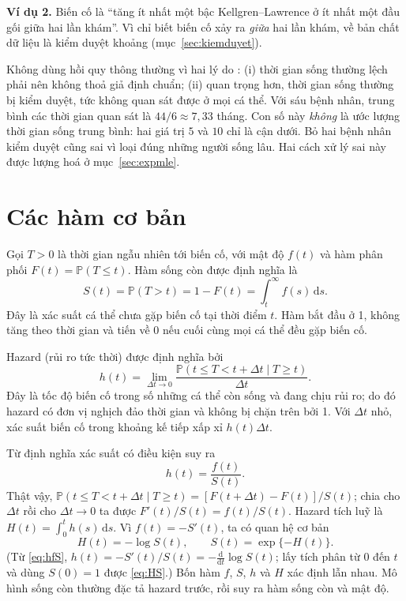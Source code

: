 \documentclass[11pt,a4paper,notitlepage]{report}
\newcommand{\Prob}{\mathbb{P}}
\newcommand{\dd}{\,\mathrm{d}}
\newcommand{\bs}[1]{\textcolor{bsblue}{#1}}
\begin{document}
\textbf{Ví dụ 2.} Biến cố là ``tăng ít nhất một bậc Kellgren--Lawrence ở ít nhất một đầu gối giữa hai lần khám''.
Vì chỉ biết biến cố xảy ra \emph{giữa} hai lần khám, về bản chất dữ liệu là kiểm duyệt khoảng (mục~\ref{sec:kiemduyet}). \cite{arbeeva2020}

Không dùng hồi quy thông thường vì hai lý do \cite{arbeeva2020}: (i) thời gian sống thường lệch phải nên không thoả giả định chuẩn; (ii) quan trọng hơn,
thời gian sống thường bị kiểm duyệt, tức không quan sát được ở mọi cá thể.
Với sáu bệnh nhân, trung bình các thời gian quan sát là $44/6\approx 7{,}33$ tháng. Con số này \emph{không} là ước lượng thời gian sống trung bình:
hai giá trị $5$ và $10$ chỉ là cận dưới. Bỏ hai bệnh nhân kiểm duyệt cũng sai vì loại đúng những người sống lâu. Hai cách xử lý sai này được lượng hoá ở mục~\ref{sec:expmle}.

\section{Các hàm cơ bản}

Gọi $T>0$ là thời gian ngẫu nhiên tới biến cố, với mật độ $f(t)$ và hàm phân phối $F(t)=\Prob(T\le t)$.
Hàm sống còn được định nghĩa là
\begin{equation}
S(t)=\Prob(T>t)=1-F(t)=\int_t^\infty f(s)\dd s.
\end{equation}
Đây là xác suất cá thể chưa gặp biến cố tại thời điểm $t$. Hàm bắt đầu ở 1, không tăng theo thời
gian và tiến về 0 nếu cuối cùng mọi cá thể đều gặp biến cố.

Hazard (rủi ro tức thời) được định nghĩa bởi
\begin{equation}
h(t)=\lim_{\Delta t\to0}\frac{\Prob(t\le T<t+\Delta t\mid T\ge t)}{\Delta t}.
\end{equation}
Đây là tốc độ biến cố trong số những cá thể còn sống và đang chịu rủi ro; do đó hazard có đơn vị
nghịch đảo thời gian và không bị chặn trên bởi 1. Với $\Delta t$ nhỏ, xác suất biến cố trong khoảng kế
tiếp xấp xỉ $h(t)\Delta t$.

Từ định nghĩa xác suất có điều kiện suy ra
\begin{equation}\label{eq:hfS}
h(t)=\frac{f(t)}{S(t)}.
\end{equation}
\bs{Thật vậy, $\Prob(t\le T<t+\Delta t\mid T\ge t)=[F(t+\Delta t)-F(t)]/S(t)$; chia cho $\Delta t$ rồi cho $\Delta t\to0$ ta được $F'(t)/S(t)=f(t)/S(t)$.}
Hazard tích luỹ là $H(t)=\int_0^t h(s)\dd s$. Vì $f(t)=-S'(t)$, ta có quan hệ cơ bản
\begin{equation}\label{eq:HS}
H(t)=-\log S(t),\qquad S(t)=\exp\{-H(t)\}.
\end{equation}
\bs{(Từ \eqref{eq:hfS}, $h(t)=-S'(t)/S(t)=-\tfrac{\mathrm d}{\mathrm dt}\log S(t)$; lấy tích phân từ 0 đến $t$ và dùng $S(0)=1$ được \eqref{eq:HS}.)}
Bốn hàm $f$, $S$, $h$ và $H$ xác định lẫn nhau. Mô hình sống còn thường đặc tả hazard trước, rồi suy
ra hàm sống còn và mật độ.
\end{document}
